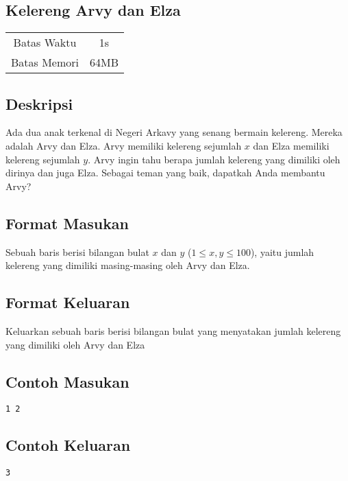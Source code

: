 \documentclass{article}
\begin{document}
\begin{center}
    \section*{Kelereng Arvy dan Elza}

    \begin{tabular}{ | c c | }
        \hline
        Batas Waktu  & 1s \\
        Batas Memori & 64MB \\
        \hline
    \end{tabular}
\end{center}

\subsection*{Deskripsi}

Ada dua anak terkenal di Negeri Arkavy yang senang bermain kelereng. Mereka adalah
Arvy dan Elza. Arvy memiliki kelereng sejumlah $x$ dan Elza memiliki kelereng sejumlah $y$.
Arvy ingin tahu berapa jumlah kelereng yang dimiliki oleh dirinya dan juga Elza. Sebagai teman yang baik, dapatkah Anda 
membantu Arvy?

\subsection*{Format Masukan}

Sebuah baris berisi bilangan bulat $x$ dan $y$ ($1 \leq x, y \leq 100$), yaitu jumlah kelereng yang dimiliki masing-masing 
oleh Arvy dan Elza.

\subsection*{Format Keluaran}

Keluarkan sebuah baris berisi bilangan bulat yang menyatakan jumlah kelereng yang dimiliki oleh Arvy dan Elza
\\

\begin{multicols}{2}
\subsection*{Contoh Masukan}
\begin{lstlisting}
1 2
\end{lstlisting}
\columnbreak
\subsection*{Contoh Keluaran}
\begin{lstlisting}
3
\end{lstlisting}
\vfill
\null
\end{multicols}


\pagebreak
\end{document}
